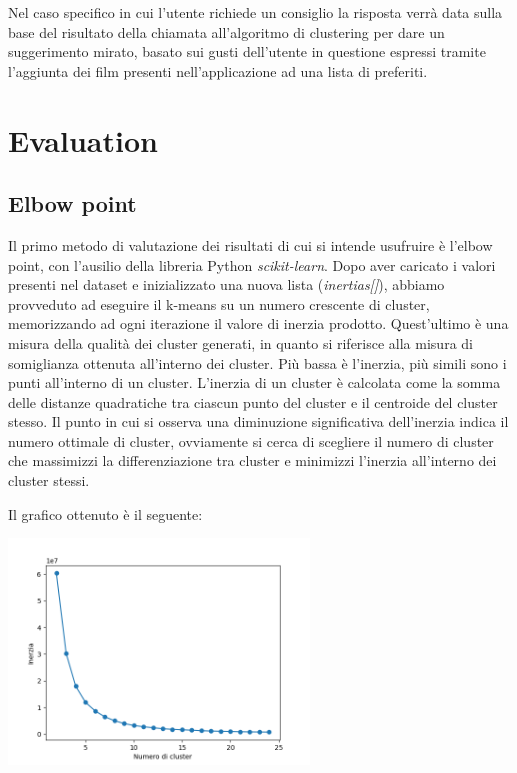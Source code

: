 \documentclass[a4paper, 10pt]{report}
\begin{document}
            Nel caso specifico in cui l'utente richiede un consiglio la risposta verrà data sulla base del risultato della chiamata
            all'algoritmo di clustering per dare un suggerimento mirato, basato sui gusti dell'utente in questione espressi tramite
            l'aggiunta dei film presenti nell'applicazione ad una lista di preferiti.

    \chapter{Evaluation}\label{ch:evaluation}

        \section{Elbow point}\label{sec:elbow-point}
        Il primo metodo di valutazione dei risultati di cui si intende usufruire è l'elbow point, con l'ausilio della
        libreria Python \textit{scikit-learn}. Dopo aver caricato i valori presenti nel dataset e inizializzato una nuova
        lista (\textit{inertias[]}), abbiamo provveduto ad eseguire il k-means su un numero crescente di cluster, memorizzando
        ad ogni iterazione il valore di inerzia prodotto.
        Quest'ultimo è una misura della qualità dei cluster generati, in quanto si riferisce alla misura di somiglianza ottenuta
        all'interno dei cluster.
        Più bassa è l'inerzia, più simili sono i punti all'interno di un cluster.
        L'inerzia di un cluster è calcolata come la somma delle distanze quadratiche tra ciascun punto del cluster e il
        centroide del cluster stesso.
        Il punto in cui si osserva una diminuzione significativa dell'inerzia indica il numero ottimale di cluster, ovviamente
        si cerca di scegliere il numero di cluster che massimizzi la differenziazione tra cluster e
        minimizzi l'inerzia all'interno dei cluster stessi.

        Il grafico ottenuto è il seguente:

        \begin{center}
            \includegraphics[width=8cm]{evaluation/elbowPoint}\\
        \end{center}
\end{document}
